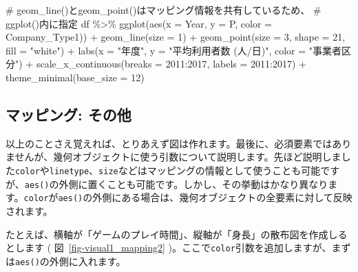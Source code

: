 \documentclass[
  a4paper,
  pandoc,
  ja=standard,
  jafont=haranoaji]{bxjsbook}
\newenvironment{Shaded}{\begin{snugshade}}{\end{snugshade}}
\newcommand{\AttributeTok}[1]{\textcolor[rgb]{0.00,0.48,0.65}{#1}}
\newcommand{\CommentTok}[1]{\textcolor[rgb]{0.37,0.37,0.37}{#1}}
\newcommand{\DecValTok}[1]{\textcolor[rgb]{0.68,0.00,0.00}{#1}}
\newcommand{\FunctionTok}[1]{\textcolor[rgb]{0.28,0.35,0.67}{#1}}
\newcommand{\NormalTok}[1]{\textcolor[rgb]{0.00,0.48,0.65}{#1}}
\newcommand{\SpecialCharTok}[1]{\textcolor[rgb]{0.37,0.37,0.37}{#1}}
\newcommand{\StringTok}[1]{\textcolor[rgb]{0.13,0.47,0.30}{#1}}
\begin{document}
\begin{Shaded}
\begin{Highlighting}[numbers=left,,]
\CommentTok{\# geom\_line()とgeom\_point()はマッピング情報を共有しているため、}
\CommentTok{\# ggplot()内に指定}
\NormalTok{df }\SpecialCharTok{\%\textgreater{}\%}
  \FunctionTok{ggplot}\NormalTok{(}\FunctionTok{aes}\NormalTok{(}\AttributeTok{x =}\NormalTok{ Year, }\AttributeTok{y =}\NormalTok{ P, }\AttributeTok{color =}\NormalTok{ Company\_Type1)) }\SpecialCharTok{+}
  \FunctionTok{geom\_line}\NormalTok{(}\AttributeTok{size =} \DecValTok{1}\NormalTok{) }\SpecialCharTok{+}
  \FunctionTok{geom\_point}\NormalTok{(}\AttributeTok{size =} \DecValTok{3}\NormalTok{, }\AttributeTok{shape =} \DecValTok{21}\NormalTok{, }\AttributeTok{fill =} \StringTok{"white"}\NormalTok{) }\SpecialCharTok{+}
  \FunctionTok{labs}\NormalTok{(}\AttributeTok{x =} \StringTok{"年度"}\NormalTok{, }\AttributeTok{y =} \StringTok{"平均利用者数 (人/日)"}\NormalTok{, }\AttributeTok{color =} \StringTok{"事業者区分"}\NormalTok{) }\SpecialCharTok{+}
  \FunctionTok{scale\_x\_continuous}\NormalTok{(}\AttributeTok{breaks =} \DecValTok{2011}\SpecialCharTok{:}\DecValTok{2017}\NormalTok{, }\AttributeTok{labels =} \DecValTok{2011}\SpecialCharTok{:}\DecValTok{2017}\NormalTok{) }\SpecialCharTok{+}
  \FunctionTok{theme\_minimal}\NormalTok{(}\AttributeTok{base\_size =} \DecValTok{12}\NormalTok{)}
\end{Highlighting}
\end{Shaded}

\hypertarget{ux30deux30c3ux30d4ux30f3ux30b0-ux305dux306eux4ed6}{%
\subsection{マッピング:
その他}\label{ux30deux30c3ux30d4ux30f3ux30b0-ux305dux306eux4ed6}}

以上のことさえ覚えれば、とりあえず図は作れます。最後に、必須要素ではありませんが、幾何オブジェクトに使う引数について説明します。先ほど説明しました\texttt{color}や\texttt{linetype}、\texttt{size}などはマッピングの情報として使うことも可能ですが、\texttt{aes()}の外側に置くことも可能です。しかし、その挙動はかなり異なります。\texttt{color}が\texttt{aes()}の外側にある場合は、幾何オブジェクトの全要素に対して反映されます。

たとえば、横軸が「ゲームのプレイ時間」、縦軸が「身長」の散布図を作成しるとします
( 図~\ref{fig-visual1_mapping2}
)。ここで\texttt{color}引数を追加しますが、まずは\texttt{aes()}の外側に入れます。
\end{document}
